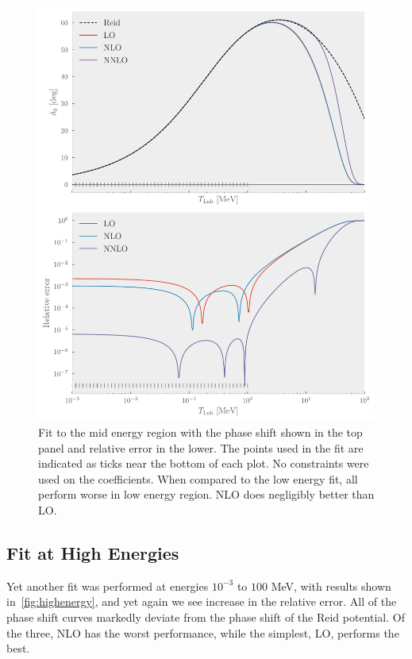 \begin{figure}[pt]
  \centering
  \includegraphics{Figures/midenergy.pdf}
  \caption{\label{fig:midenergy}Fit to the mid energy region with the phase
    shift shown in the top panel and relative error in the lower. The points
    used in the fit are indicated as ticks near the bottom of each plot. No
    constraints were used on the coefficients. When compared to the low energy
    fit, all perform worse in low energy region. NLO does negligibly better than
  LO.}
\end{figure}

\subsection{Fit at High Energies}

Yet another fit was performed at energies \(10^{-3}\) to \(100\) MeV, with
results shown in~\cref{fig:highenergy}, and yet again we see increase in the
relative error. All of the phase shift curves markedly deviate from the phase
shift of the Reid potential. Of the three, NLO has the worst performance, while
the simplest, LO, performs the best.

